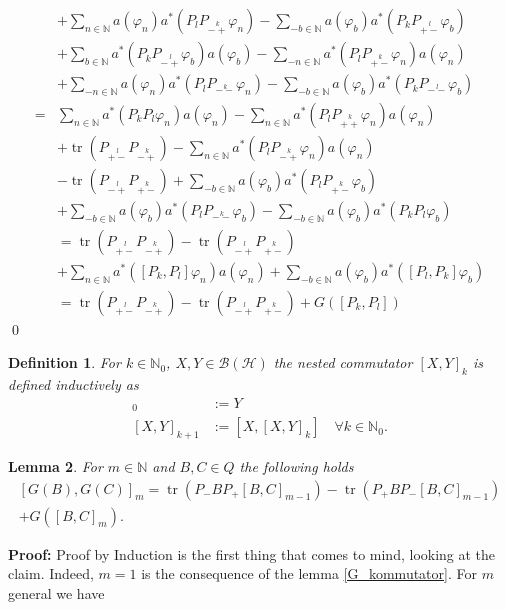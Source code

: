 \documentclass[b5paper,draft,openbib,12pt]{memoir}
\newtheorem{Def}{Definition}[section]
\newtheorem{Lemma}[Def]{Lemma}
\DeclareMathOperator{\tr}{tr}
\begin{document}
\begin{align*}
&+\sum_{n\in\mathbb{N}}a(\varphi_n)a^*\left(P_l P_{\stackrel{k}{-+}}\varphi_n\right) - \sum_{-b\in\mathbb{N}} a(\varphi_b)a^*\left(P_k P_{\stackrel{l}{+-}}\varphi_b\right)\\
&+\sum_{b\in\mathbb{N}}a^*\left(P_k P_{\stackrel{l}{-+}}\varphi_b\right)a(\varphi_b)-\sum_{-n\in\mathbb{N}}a^*\left(P_l P_{\stackrel{k}{+-}}\varphi_n\right) a(\varphi_n)\\
&+\sum_{-n\in\mathbb{N}}a(\varphi_n)a^*\left(P_l P_{\stackrel{k}{--}}\varphi_n\right) - \sum_{-b \in \mathbb{N}} a(\varphi_b)a^*\left(P_k P_{\stackrel{l}{--}}\varphi_b\right)\\
=&\sum_{n\in\mathbb{N}} a^*\left(P_k P_l \varphi_n \right) a(\varphi_n) - \sum_{n\in\mathbb{N}} a^*\left(P_l P_{\stackrel{k}{++}} \varphi_n \right) a(\varphi_n)\\
&+\tr \left( P_{\stackrel{l}{+-}} P_{\stackrel{k}{-+}}\right) - \sum_{n\in\mathbb{N}} a^*\left( P_l P_{\stackrel{k}{-+}} \varphi_n\right)a(\varphi_n)\\
&-\tr \left( P_{\stackrel{l}{-+}} P_{\stackrel{k}{+-}}\right) + \sum_{-b\in\mathbb{N}} a(\varphi_b) a^*\left(P_l P_{\stackrel{k}{+-}} \varphi_b\right)\\
&+\sum_{-b\in\mathbb{N}} a(\varphi_b) a^*\left( P_l P_{\stackrel{k}{--}}\varphi_b\right) - \sum_{-b\in\mathbb{N}} a(\varphi_b) a^*\left( P_k P_l \varphi_b\right)\\
&=\tr \left( P_{\stackrel{l}{+-}} P_{\stackrel{k}{-+}}\right)
-\tr \left( P_{\stackrel{l}{-+}} P_{\stackrel{k}{+-}}\right)\\
&+\sum_{n\in\mathbb{N}} a^*\left(\left[P_k ,P_l\right] \varphi_n \right) a(\varphi_n)
+\sum_{-b\in\mathbb{N}} a(\varphi_b)a^*\left(\left[P_l ,P_k\right] \varphi_b \right) \\
&=\tr \left( P_{\stackrel{l}{+-}} P_{\stackrel{k}{-+}}\right)
-\tr \left( P_{\stackrel{l}{-+}} P_{\stackrel{k}{+-}}\right)
+G\left(\left[P_k,P_l\right]\right)
\end{align*}
\qed

\begin{Def}
For \(k\in\mathbb{N}_0\), \(X,Y\in \mathcal{B}(\mathcal{H})\) the nested commutator \([X,Y]_k\) is defined inductively as
\begin{align*}
[X,Y]_0&:= Y\\
[X,Y]_{k+1}&:=[X,[X,Y]_{k}] \quad \forall k\in\mathbb{N}_0.
\end{align*}
\end{Def}

\begin{Lemma}\label{nested_kommuted_G}
For \(m\in\mathbb{N}\) and \(B,C \in Q\) the following holds
\begin{multline}
\left[ G(B),G(C)\right]_m=  \tr\left(P_-BP_+[B,C]_{m-1}\right) - \tr\left(P_+BP_-[B,C]_{m-1}\right)\\
+G\left([B,C]_m\right) .
\end{multline}
\end{Lemma}
\textbf{Proof:} Proof by Induction is the first thing that comes to mind, looking at the claim. Indeed, \(m=1\) is the consequence
of the lemma \ref{G_kommutator}. For \(m\) general we have
\end{document}

